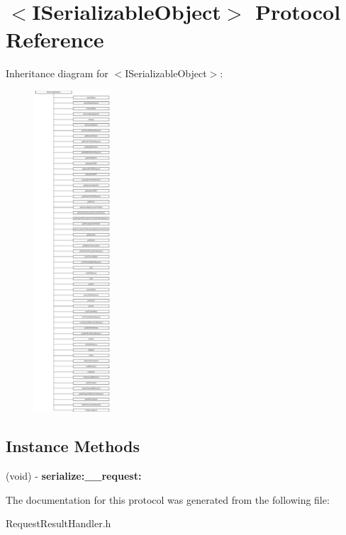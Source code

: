 \hypertarget{protocol_i_serializable_object-p}{}\section{$<$I\+Serializable\+Object$>$ Protocol Reference}
\label{protocol_i_serializable_object-p}
Inheritance diagram for $<$I\+Serializable\+Object$>$\+:\begin{figure}[H]
\begin{center}
\leavevmode
\includegraphics[height=12.000000cm]{protocol_i_serializable_object-p}
\end{center}
\end{figure}
\subsection*{Instance Methods}
\begin{DoxyCompactItemize}
\item 
\hypertarget{protocol_i_serializable_object-p_adea4db2ac708863f60e65de05f293a0c}{}(void) -\/ {\bfseries serialize\+:\+\_\+\+\_\+request\+:}\label{protocol_i_serializable_object-p_adea4db2ac708863f60e65de05f293a0c}

\end{DoxyCompactItemize}


The documentation for this protocol was generated from the following file\+:\begin{DoxyCompactItemize}
\item 
Request\+Result\+Handler.\+h\end{DoxyCompactItemize}
